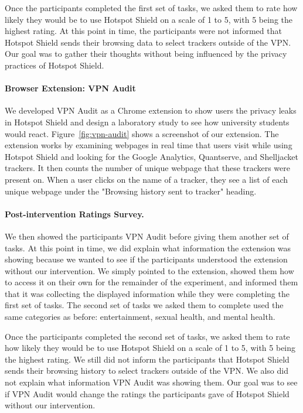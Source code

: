 Once the participants completed the first set of tasks, we asked them to rate
how likely they would be to use Hotspot Shield on a scale of 1 to 5, with 5
being the highest rating.  At this point in time, the participants were not
informed that Hotspot Shield sends their browsing data to select trackers
outside of the VPN.  Our goal was to gather their thoughts without being
influenced by the privacy practices of Hotspot Shield.

\paragraph{Browser Extension: VPN Audit}
We developed VPN Audit as a Chrome extension to show users the privacy leaks
in Hotspot Shield and design a laboratory study to see how university students
would react.  Figure~\ref{fig:vpn-audit} shows a screenshot of our extension.
The extension works by examining webpages in real time that users visit while
using Hotspot Shield and looking for the Google Analytics, Quantserve, and
Shelljacket trackers.  It then counts the number of unique webpage that these
trackers were present on.  When a user clicks on the name of a tracker, they
see a list of each unique webpage under the "Browsing history sent to tracker"
heading. 


\paragraph{Post-intervention Ratings Survey.}
We then showed the participants VPN Audit before giving them another set of tasks.
At this point in time, we did explain what information the extension was showing because we wanted to see if the participants understood the extension without our intervention.
We simply pointed to the extension, showed them how to access it on their own for the remainder of the experiment, and informed them that it was collecting the displayed information while they were completing the first set of tasks.
The second set of tasks we asked them to complete used the same categories as before: entertainment, sexual health, and mental health.

Once the participants completed the second set of tasks, we asked them to rate how likely they would be to use Hotspot Shield on a scale of 1 to 5, with 5 being the highest rating.
We still did not inform the participants that Hotspot Shield sends their browsing history to select trackers outside of the VPN.
We also did not explain what information VPN Audit was showing them.
Our goal was to see if VPN Audit would change the ratings the participants gave of Hotspot Shield without our intervention.

